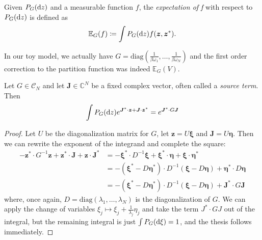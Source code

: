 \begin{definition}
	Given $P_G(\mathrm{d} z)$ and a measurable function $f$, the \textit{expectation of f} with
	respect to $P_G(\mathrm{d} z)$ is defined as
	\begin{align*}
		\mathbb{E}_G(f) \coloneq \int P_G(\mathrm{d} z) f(\boldsymbol{z},\boldsymbol{z}^*).
	\end{align*}
\end{definition}
\begin{remark}
	In our toy model, we actually have $G=\mathrm{diag}\left(\frac{1}{\beta\omega_1},\ldots,
	\frac{1}{\beta\omega_N}\right)$ and the first order correction to the partition function
	was indeed $\mathbb{E}_G(V)$.
\end{remark}

\begin{lemma}
	\label{lemma:source-terms}
	Let $G\in\mathcal{C}_N$ and let $\boldsymbol{J}\in\mathbb{C}^N$ be a fixed complex vector,
	often called a \textit{source term}. Then
	\begin{align*}
		\int P_G(\mathrm{d} z) e^{\boldsymbol{J}^*\cdot\boldsymbol{z} + \boldsymbol{J}\cdot\boldsymbol{z}^*}
		= e^{\boldsymbol{J}^*\cdot G\boldsymbol{J}}
	\end{align*}
\end{lemma}
\begin{proof}
	Let $U$ be the diagonalization matrix for $G$, let $\boldsymbol{z}=U\boldsymbol{\xi}$ and
	$\boldsymbol{J}=U\boldsymbol{\eta}$. Then we can rewrite the exponent of the integrand
	and complete the square:
	\begin{align*}
		-\boldsymbol{z}^*\cdot G^{-1}\boldsymbol{z} + \boldsymbol{z}^*\cdot\boldsymbol{J} + \boldsymbol{z}\cdot\boldsymbol{J}^*
		&= -\boldsymbol{\xi}^*\cdot D^{-1}\boldsymbol{\xi} + \boldsymbol{\xi}^*\cdot\boldsymbol{\eta} + \boldsymbol{\xi}\cdot\boldsymbol{\eta}^*\\
		&= -(\boldsymbol{\xi}^*-D\boldsymbol{\eta}^*)\cdot D^{-1}(\boldsymbol{\xi}-D\boldsymbol{\eta}) + \boldsymbol{\eta}^*\cdot D\boldsymbol{\eta}\\
		&= -(\boldsymbol{\xi}^*-D\boldsymbol{\eta}^*)\cdot D^{-1}(\boldsymbol{\xi}-D\boldsymbol{\eta}) + \boldsymbol{J}^*\cdot G\boldsymbol{J}
	\end{align*}
	where, once again, $D=\mathrm{diag}(\lambda_1,\ldots,\lambda_N)$ is the diagonalization of
	$G$. We can apply the change of variables $\xi_j\mapsto\xi_j+\frac{1}{\lambda_j}\eta_j$ and
	take the term $J^*\cdot GJ$ out of the integral, but the remaining integral is just $\int
	P_G(\mathrm{d}\xi)=1$, and the thesis follows immediately.
\end{proof}

